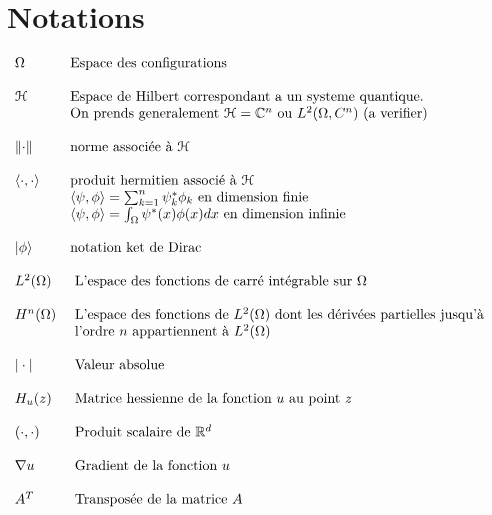 \chapter*{Notations}
$
\begin{array}{ll}
\Omega & \mbox{Espace des configurations}\\\\
\mathcal{H} & \mbox{Espace de Hilbert correspondant a un systeme quantique.}\\
& \mbox{On prends generalement } \mathcal{H} = \mathbb C^n \mbox{ ou } L^2(\Omega, C^n) \mbox{ (a verifier)}\\\\
\lVert\cdot\rVert &  \mbox{norme associée à } \mathcal{H}\\\\
\langle\cdot,\cdot\rangle & \mbox{produit hermitien associé à } \mathcal{H}\\
& \langle\psi,\phi\rangle=\sum_{k=1}^{n} \psi^*_k \phi_k \mbox{ en dimension finie}\\
& \langle\psi,\phi\rangle=\int_{\Omega} \psi^*(x) \phi(x) dx \mbox{ en dimension infinie}\\\\
| \phi \rangle & \mbox{notation ket de Dirac}\\\\
L^2(\Omega) & \mbox{ L'espace des fonctions de carré intégrable sur } \Omega\\\\
H^n(\Omega) & \mbox{ L’espace des fonctions de }L^2(\Omega) \mbox{ dont les dérivées partielles jusqu’à }\\
&\mbox{ l’ordre } n \mbox{ appartiennent à } L^2(\Omega)\\\\
|\cdot| & \mbox{ Valeur absolue}\\\\
H_u(z) &  \mbox{ Matrice hessienne de la fonction } u \mbox{ au point } z\\\\
\left(\cdot,\cdot \right) & \mbox{ Produit scalaire de }\mathbb{R}^d\\\\
\nabla u & \mbox{ Gradient de la fonction } u\\\\
A^T & \mbox{ Transposée de la matrice } A\\\\
\end{array}
$
